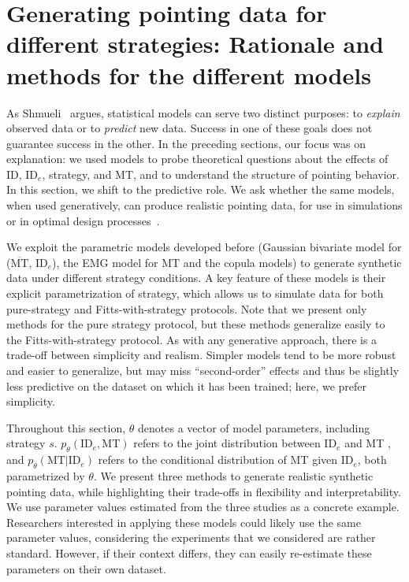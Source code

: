\documentclass[acmlarge, manuscript,review]{acmart}
\newcommand{\mmt}{\ensuremath{\overline{\mt}}\xspace}
\newcommand{\mt}{\ensuremath{{\text{MT}}}\xspace}
\newcommand{\ide}{\ensuremath{{\text{ID}_e}}\xspace}
\begin{document}

\section{Generating pointing data for different strategies: Rationale and methods for the different models \label{sec:gen}}
As Shmueli~\cite{shmueli2010} argues, statistical models can serve two distinct purposes: to \textit{explain} observed data or to \textit{predict} new data. Success in one of these goals does not guarantee success in the other. In the preceding sections, our focus was on explanation: we used models to probe theoretical questions about the effects of ID, \ide, strategy, and MT, and to understand the structure of pointing behavior. In this section, we shift to the predictive role. We ask whether the same models, when used generatively, can produce realistic pointing data, for use \eg in simulations or in optimal design processes~\cite{oulasvirta2018,murray2022}.

We exploit the parametric models developed before (Gaussian bivariate model for (\mmt, \ide), the EMG model for MT and the copula models) to generate synthetic data under different strategy conditions. A key feature of these models is their explicit parametrization of strategy, which allows us to simulate data for both pure-strategy and Fitts-with-strategy protocols. Note that we present only methods for the pure strategy protocol, but these methods generalize easily to the Fitts-with-strategy protocol.
As with any generative approach, there is a trade-off between simplicity and realism. Simpler models tend to be more robust and easier to generalize, but may miss ``second-order'' effects and thus be slightly less predictive on the dataset on which it has been trained; here, we prefer simplicity.

Throughout this section, $\theta$ denotes a vector of model parameters, including strategy $s$. $p_{\theta}(\ide, \mt)$ refers to the joint distribution between \ide and MT , and $p_{\theta}(\mt|\ide)$ refers to the conditional distribution of MT given \ide, both parametrized by $\theta$. We present three methods to generate realistic synthetic pointing data, while highlighting their trade-offs in flexibility and interpretability.
We use parameter values estimated from the three studies as a concrete example. Researchers interested in applying these models could likely use the same parameter values, considering the experiments that we considered are rather standard. However, if their context differs, they can easily re-estimate these parameters on their own dataset.
\end{document}
